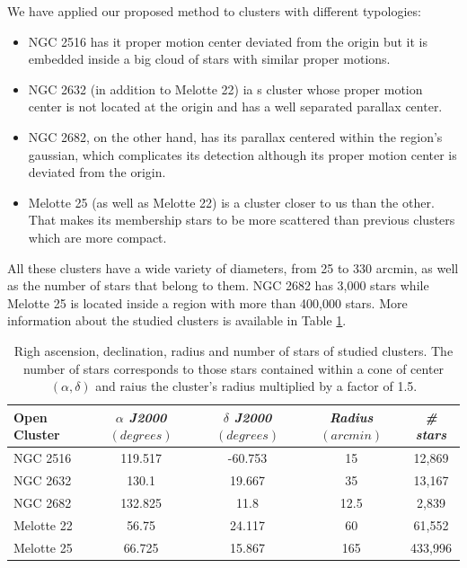 \documentclass[11pt, a4paper, english]{book}
\begin{document}
We have applied our proposed method to clusters with different typologies:

\begin{itemize}
  \item NGC 2516 has it proper motion center deviated from the origin but
        it is embedded inside a big cloud of stars with similar proper motions.
  \item NGC 2632 (in addition to Melotte 22) ia s cluster whose proper motion center
        is not located at the origin and has a well separated parallax center.
  \item NGC 2682, on the other hand, has its parallax centered within the region's gaussian,
        which complicates its detection although its proper motion center is deviated from the origin.
  \item Melotte 25 (as well as Melotte 22) is a cluster closer to us than the other.
        That makes its membership stars to be more scattered than previous clusters which are more compact.
\end{itemize}

All these clusters have a wide variety of diameters, from 25 to 330 arcmin,
as well as the number of stars that belong to them. NGC 2682 has 3,000 stars
while Melotte 25 is located inside a region with more than 400,000 stars.
More information about the studied clusters is available in Table \ref{tab:clusters_summary}.

\begin{table}[h!]
  \begin{center}
    \begin{tabular}{l|c|c|c|c}
      \textbf{Open Cluster} & \emph{$\alpha$ J2000 $(degrees)$} & \emph{$\delta$ J2000 $(degrees)$} & \emph{Radius $(arcmin)$} & \emph{\# stars} \\
      \hline
      NGC 2516 & 119.517 & -60.753 & 15 & 12,869 \\
      NGC 2632 & 130.1 & 19.667 & 35 & 13,167 \\
      NGC 2682 & 132.825 & 11.8 & 12.5 & 2,839 \\
      Melotte 22 & 56.75 & 24.117 & 60 & 61,552 \\
      Melotte 25 & 66.725 & 15.867 & 165 & 433,996 \\
    \end{tabular}
    \caption{Righ ascension, declination, radius and number of stars of studied clusters.
             The number of stars corresponds to those stars contained within a cone of center
             $(\alpha, \delta)$ and raius the cluster's radius multiplied by a factor of 1.5.}
    \label{tab:clusters_summary}
  \end{center}
\end{table}
\end{document}
